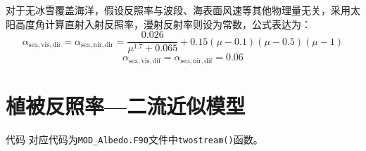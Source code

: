 对于无冰雪覆盖海洋，假设反照率与波段、海表面风速等其他物理量无关，采用太阳高度角计算直射入射反照率，漫射反射率则设为常数，公式表达为：
\begin{equation}
  \alpha_{\mathrm{sea,vis,dir}}=\alpha_{\mathrm{sea,nir,dir}} = \frac{0.026}{\mu^{1.7}+0.065}+0.15(\mu-0.1)(\mu-0.5)(\mu-1)
\end{equation}
%
\begin{equation}
  \alpha_{\mathrm{sea,vis,dif}}=\alpha_{\mathrm{sea,nir,dif}} = 0.06
\end{equation}

\section{植被反照率---二流近似模型}\label{植被反照率二流近似模型}
\begin{mymdframed}{代码}
  对应代码为\texttt{MOD\_Albedo.F90}文件中\texttt{twostream()}函数。
\end{mymdframed}

